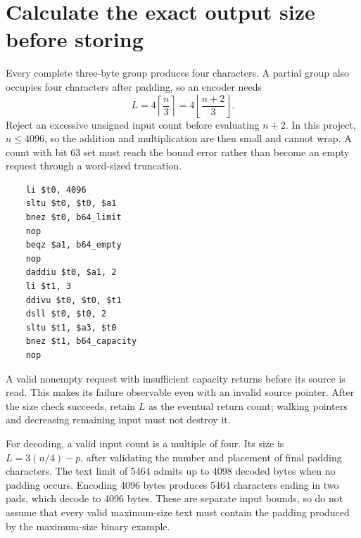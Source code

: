 \section{Calculate the exact output size before storing}
Every complete three-byte group produces four characters. A partial group also occupies
four characters after padding, so an encoder needs
\[
  L=4\left\lceil\frac n3\right\rceil
  =4\left\lfloor\frac{n+2}{3}\right\rfloor.
\]
Reject an excessive unsigned input count before evaluating \(n+2\). In this project,
\(n\le4096\), so the addition and multiplication are then small and cannot wrap.
A count with bit 63 set must reach the bound error rather than become an empty request
through a word-sized truncation.

\begin{verbatim}
    li $t0, 4096
    sltu $t0, $t0, $a1
    bnez $t0, b64_limit
    nop
    beqz $a1, b64_empty
    nop
    daddiu $t0, $a1, 2
    li $t1, 3
    ddivu $t0, $t0, $t1
    dsll $t0, $t0, 2
    sltu $t1, $a3, $t0
    bnez $t1, b64_capacity
    nop
\end{verbatim}

A valid nonempty request with insufficient capacity returns before its source is read.
This makes its failure observable even with an invalid source pointer. After the size
check succeeds, retain \(L\) as the eventual return count; walking pointers and decreasing
remaining input must not destroy it.

For decoding, a valid input count is a multiple of four. Its size is
\(L=3(n/4)-p\), after validating the number and placement of final padding characters.
The text limit of 5464 admits up to 4098 decoded bytes when no padding occurs. Encoding
4096 bytes produces 5464 characters ending in two pads, which decode to 4096 bytes.
These are separate input bounds, so do not assume that every valid maximum-size text
must contain the padding produced by the maximum-size binary example.
